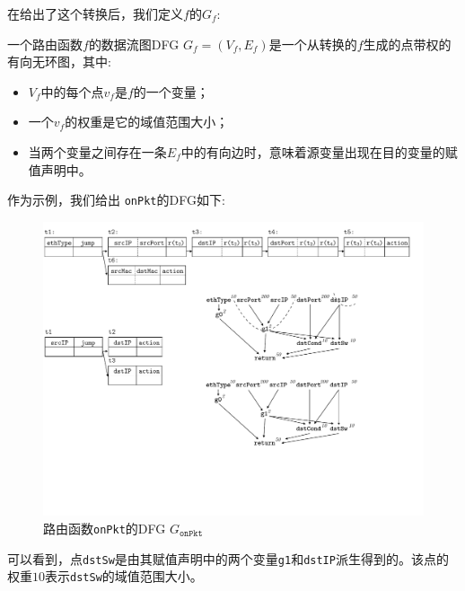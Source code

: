 在给出了这个转换后，我们定义$f$的$G_f$:

\begin{definition} 一个路由函数$f$的数据流图DFG $G_f = (V_f, E_f)$是一个从转换的$f$生成的点带权的有向无环图，其中:
\begin{itemize}
  \item $V_f$中的每个点$v_f$是$f$的一个变量；
  \item 一个$v_f$的权重是它的域值范围大小；
  \item 当两个变量之间存在一条$E_f$中的有向边时，意味着源变量出现在目的变量的赋值声明中。
\end{itemize}
\end{definition}

作为示例，我们给出 \texttt{onPkt}的DFG如下:
\begin{figure}[tbh]
    \centering
    \vspace{-1mm}
    \includegraphics[scale = 0.6]{figures/figure2.pdf}
    \vspace{-2mm}
    \caption{路由函数\texttt{onPkt}的DFG $G_{\texttt{onPkt}}$}
    \label{cap:fig:onpkt-dfg}
    \vspace{-2mm}
\end{figure}

可以看到，点\texttt{dstSw}是由其赋值声明中的两个变量\texttt{g1}和\texttt{dstIP}派生得到的。该点的权重$10$表示\texttt{dstSw}的域值范围大小。




